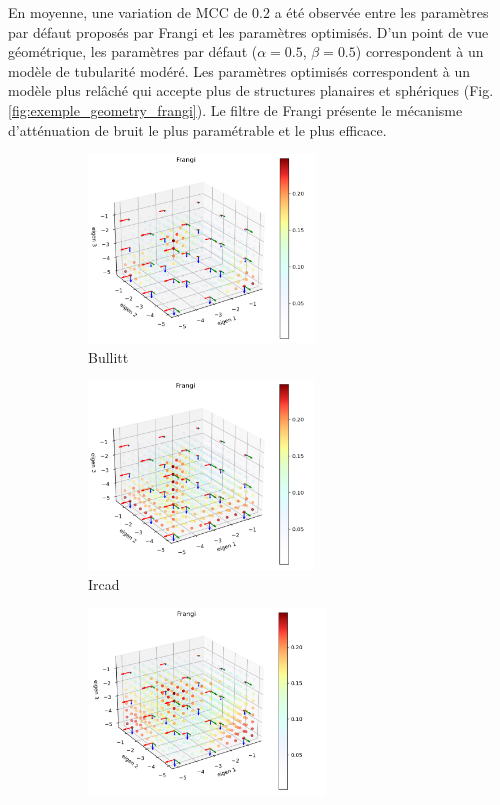 En moyenne, une variation de MCC de $0.2$ a été observée entre les paramètres par défaut proposés par Frangi et les paramètres optimisés. D'un point de vue géométrique, les paramètres par défaut ($\alpha=0.5$, $\beta=0.5$) correspondent à un modèle de tubularité modéré. Les paramètres optimisés correspondent à un modèle plus relâché qui accepte plus de structures planaires et sphériques (Fig. \ref{fig:exemple_geometry_frangi}). Le filtre de Frangi présente le mécanisme d'atténuation de bruit le plus paramétrable et le plus efficace.

\begin{figure}[H]

  \begin{subfigure}[t]{0.45\textwidth}
    \centering
    \includegraphics[height=5cm]{Images/Bullitt_Frangi_BP.png}
    \caption{Bullitt}
  \end{subfigure}
  \begin{subfigure}[t]{0.45\textwidth}
    \centering
    \includegraphics[height=5cm]{Images/Ircad_Frangi_BP.png}
    \caption{Ircad}
  \end{subfigure}
  \begin{subfigure}[t]{0.45\textwidth}
    \centering
    \includegraphics[height=5cm]{Images/Vascu_2_Frangi_BP.png}

\end{subfigure}
\end{figure}
